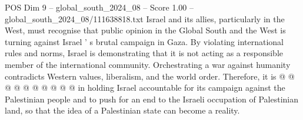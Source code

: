 \begin{textsample}{POS Dim 9 – global\_south\_2024\_08 – Score 1.00 – global\_south\_2024\_08/111638818.txt}
Israel and its allies, particularly in the West, must recognise that public opinion in the Global South and the West is turning against Israel ' s brutal campaign in Gaza.
By violating international rules and norms, Israel is demonstrating that it is not acting as a responsible member of the international community.
Orchestrating a war against humanity contradicts Western values, liberalism, and the world order.
Therefore, it is @ @ @ @ @ @ @ @ @ @ in holding Israel accountable for its campaign against the Palestinian people and to push for an end to the Israeli occupation of Palestinian land, so that the idea of a Palestinian state can become a reality.

\end{textsample}
